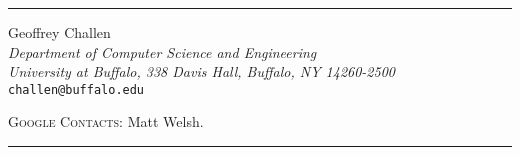 \thispagestyle{empty}
\noindent{\LARGE\scshape{\thetitle}}
\vspace*{0.5em}
\hrule
\vspace*{0.2em}
\begin{tightcenter}
{\large Geoffrey Challen}\\
\emph{Department of Computer Science and Engineering\\
University at Buffalo, 338 Davis Hall,  Buffalo, NY 14260-2500}\\
\texttt{challen@buffalo.edu}\\
\end{tightcenter}
{\normalsize
\textsc{Google Contacts:} Matt Welsh.}
\vspace*{0.5em}
\hrule
{}
\pagestyle{proposal}
